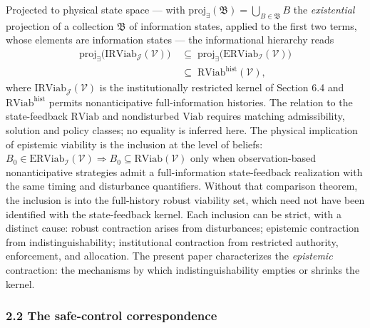 \documentclass[10pt,twocolumn]{article}
\theoremstyle{definition}
\begin{document}
Projected to physical state space --- with
\(\mathrm{proj}_{\exists}(\mathfrak{B}) = \bigcup_{B \in \mathfrak{B}} B\)
the \emph{existential} projection of a collection \(\mathfrak{B}\) of
information states, applied to the first two terms, whose elements are information states --- the informational hierarchy
reads
\[
\begin{aligned}
\mathrm{proj}_{\exists}\big(\mathrm{IRViab}_{\mathcal{J}}(\mathcal{V})\big)&\;\subseteq\; \mathrm{proj}_{\exists}\big(\mathrm{ERViab}_{\mathcal{I}}(\mathcal{V})\big) \\
&\;\subseteq\; \mathrm{RViab}^{\mathrm{hist}}(\mathcal{V}),
\end{aligned}
\]
where \(\mathrm{IRViab}_{\mathcal{J}}(\mathcal{V})\) is the institutionally restricted kernel of Section 6.4 and \(\mathrm{RViab}^{\mathrm{hist}}\) permits nonanticipative full-information histories. The relation to the state-feedback \(\mathrm{RViab}\) and nondisturbed \(\mathrm{Viab}\) requires matching admissibility, solution and policy classes; no equality is inferred here. The physical implication of epistemic viability is the
inclusion at the level of beliefs:
\(B_0 \in \mathrm{ERViab}_{\mathcal{I}}(\mathcal{V}) \Rightarrow B_0 \subseteq \mathrm{RViab}(\mathcal{V})\) only when observation-based nonanticipative strategies admit a full-information state-feedback realization with the same timing and disturbance quantifiers. Without that comparison theorem, the inclusion is into the full-history robust viability set, which need not have been identified with the state-feedback kernel.
Each inclusion can be strict, with a distinct cause: robust contraction
arises from disturbances; epistemic contraction from
indistinguishability; institutional contraction from restricted
authority, enforcement, and allocation. The present paper characterizes
the \emph{epistemic} contraction: the mechanisms by which
indistinguishability empties or shrinks the kernel.

\subsubsection{2.2 The safe-control
correspondence}\label{calc-the-safe-control-correspondence}
\end{document}
